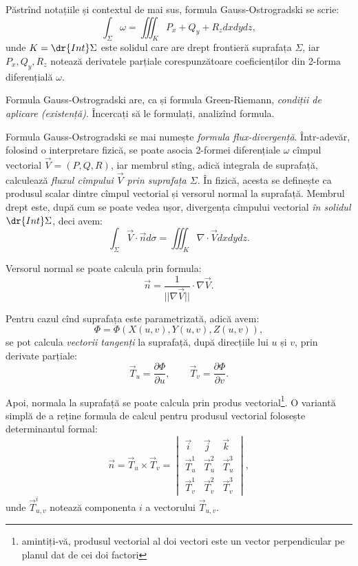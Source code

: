Păstrînd notațiile și contextul de mai sus, formula Gauss-Ostrogradski se
scrie:
\[
  \int_\Sigma \omega = \iiint_K P_x + Q_y + R_z dxdydz,
\]
unde $ K = \dr{Int}\Sigma $ este solidul care are drept frontieră suprafața
$ \Sigma $, iar $ P_x, Q_y, R_z $ notează derivatele parțiale corespunzătoare
coeficienților din 2-forma diferențială $ \omega $.

\begin{remark}\label{rk:go-exist}
  Formula Gauss-Ostrogradski are, ca și formula Green-Riemann, \emph{condiții %
  de aplicare (existență)}. Încercați să le formulați, analizînd formula.
\end{remark}

Formula Gauss-Ostrogradski se mai numește \emph{formula flux-divergență}.
Într-adevăr, folosind o interpretare fizică, se poate asocia 2-formei diferențiale
$ \omega $ cîmpul vectorial $ \vec{V} = (P, Q, R) $, iar membrul stîng, adică
integrala de suprafață, calculează \emph{fluxul cîmpului $ \vec{V}$ prin suprafața
  $ \Sigma $}. În fizică, acesta se definește ca produsul scalar dintre cîmpul
vectorial și versorul normal la suprafață. Membrul drept este, după cum se poate
vedea ușor, divergența cîmpului vectorial \emph{în solidul $ \dr{Int}\Sigma $},
deci avem:
\[
  \int_\Sigma \vec{V} \cdot \vec{n} d\sigma = \iiint_K \nabla \cdot \vec{V} dxdydz.
\]

Versorul normal se poate calcula prin formula:
\[
  \vec{n} = \dfrac{1}{||\nabla \vec{V}||} \cdot \nabla \vec{V}.
\]

Pentru cazul cînd suprafața este parametrizată, adică avem:
\[
  \Phi = \Phi(X(u, v), Y(u, v), Z(u, v)),
\]
se pot calcula \emph{vectorii tangenți} la suprafață, după direcțiile
lui $ u $ și $ v $, prin derivate parțiale:
\[
  \vec{T}_u = \dfrac{\partial \Phi}{\partial u}, \qquad %
  \vec{T}_v = \dfrac{\partial \Phi}{\partial v}.
\]

Apoi, normala la suprafață se poate calcula prin produs vectorial\footnote{
  amintiți-vă, produsul vectorial al doi vectori este un vector perpendicular
  pe planul dat de cei doi factori}. O variantă simplă de a reține formula
de calcul pentru produsul vectorial folosește determinantul formal:
\[
  \vec{n} = \vec{T}_u \times \vec{T}_v = %
  \begin{vmatrix}
    \vec{i} & \vec{j} & \vec{k} \\
    \vec{T}_u^1 & \vec{T}_u^2 & \vec{T}_u^3 \\
    \vec{T}_v^1 & \vec{T}_v^2 & \vec{T}_v^3
  \end{vmatrix},
\]
unde $ \vec{T}_{u,v}^i $ notează componenta $ i $ a vectorului $ \vec{T}_{u, v} $.


